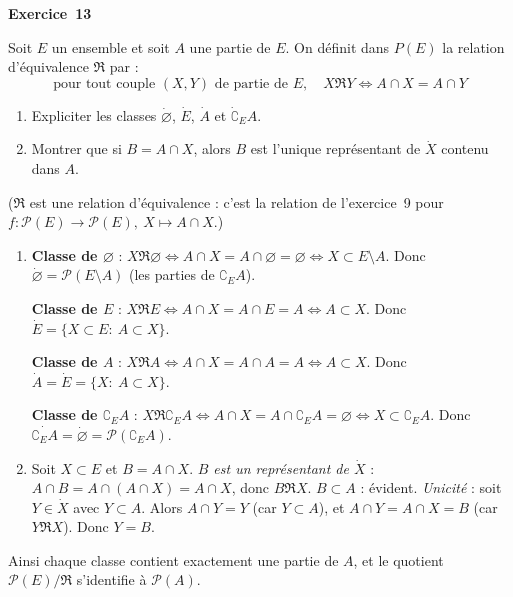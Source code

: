 \documentclass[11pt,a4paper]{article}
\newcommand{\eqv}{\mathfrak{R}}
\begin{document}
	\medskip\noindent\textbf{\Large\color{bleu}Exercice~13}\nopagebreak
	\begin{enonce}
		Soit $E$ un ensemble et soit $A$ une partie de $E$.
		On définit dans $P(E)$ la relation d'équivalence $\mathfrak{R}$ par :
		\[
		\text{pour tout couple } (X,Y) \text{ de partie de } E, \quad X \mathfrak{R} Y \Longleftrightarrow A \cap X = A \cap Y
		\]
		\begin{enumerate}
			\item[1)] Expliciter les classes $\dot{\varnothing}$, $\dot{E}$, $\dot{A}$ et $\dot{\complement}_E A$.
			\item[2)] Montrer que si $B = A \cap X$, alors $B$ est l'unique représentant de $\dot{X}$ contenu dans $A$.
		\end{enumerate}
	\end{enonce}
	\begin{corrige}
		($\eqv$ est une relation d'équivalence : c'est la relation de l'exercice~9 pour $f:\mathcal P(E)\to\mathcal P(E),\ X\mapsto A\cap X$.)
		\begin{enumerate}
			\item[1)] \textbf{Classe de $\varnothing$} : $X\eqv\varnothing\iff A\cap X=A\cap\varnothing=\varnothing\iff X\subset E\setminus A$. Donc $\dot\varnothing=\mathcal P(E\setminus A)$ (les parties de $\complement_EA$).
			
			\textbf{Classe de $E$} : $X\eqv E\iff A\cap X=A\cap E=A\iff A\subset X$. Donc $\dot E=\{X\subset E:\ A\subset X\}$.
			
			\textbf{Classe de $A$} : $X\eqv A\iff A\cap X=A\cap A=A\iff A\subset X$. Donc $\dot A=\dot E=\{X:\ A\subset X\}$.
			
			\textbf{Classe de $\complement_EA$} : $X\eqv\complement_EA\iff A\cap X=A\cap\complement_EA=\varnothing\iff X\subset\complement_EA$. Donc $\dot{\complement_EA}=\dot\varnothing=\mathcal P(\complement_EA)$.
			\item[2)] Soit $X\subset E$ et $B=A\cap X$. \emph{$B$ est un représentant de $\dot X$} : $A\cap B=A\cap(A\cap X)=A\cap X$, donc $B\eqv X$. \emph{$B\subset A$} : évident. \emph{Unicité} : soit $Y\in\dot X$ avec $Y\subset A$. Alors $A\cap Y=Y$ (car $Y\subset A$), et $A\cap Y=A\cap X=B$ (car $Y\eqv X$). Donc $Y=B$.
		\end{enumerate}
		Ainsi chaque classe contient exactement une partie de $A$, et le quotient $\mathcal P(E)/\eqv$ s'identifie à $\mathcal P(A)$.
	\end{corrige}
	
\end{document}
